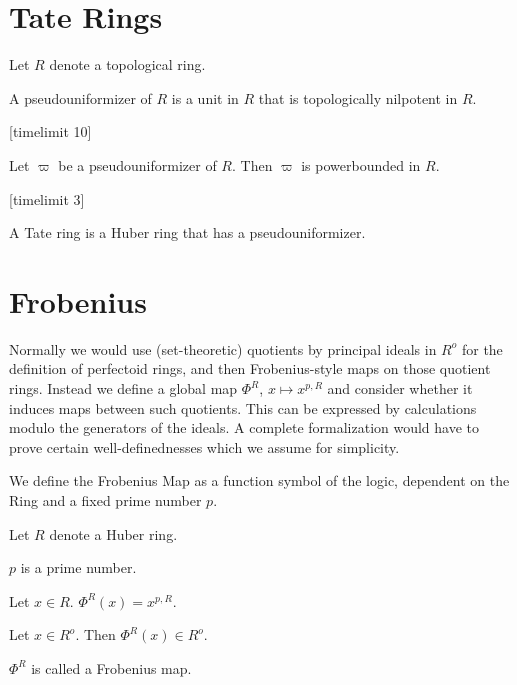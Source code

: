 \documentclass[english,11pt]{article}
\begin{document}
\section{Tate Rings}

\begin{forthel}

Let $R$ denote a topological ring.

\begin{definition}
A pseudouniformizer of $R$ is
a unit in $R$ that is topologically nilpotent in $R$.
\end{definition}


[timelimit 10]
\begin{lemma}
Let $\varpi$ be a pseudouniformizer of $R$.
Then $\varpi$ is powerbounded in $R$.
\end{lemma}
[timelimit 3]
\begin{definition}
A Tate ring is a Huber ring that has a pseudouniformizer.
\end{definition} 

\end{forthel} 
\section{Frobenius}
Normally we would use (set-theoretic) quotients by principal ideals in $R^o$
for the definition of perfectoid rings, and then Frobenius-style maps on
those quotient rings.
Instead we define a global map $\Phi^R$, $x \mapsto x^{p,R}$ and consider
whether it induces maps between such quotients. This
can be expressed by calculations modulo the generators of the ideals. 
A complete formalization would have to prove certain well-definednesses
which we assume for simplicity.

We define the Frobenius Map as a function symbol of the logic, dependent
on the Ring and a fixed prime number $p$.

\begin{forthel}
Let $R$ denote a Huber ring.

\begin{signature} $p$ is a prime number. 
\end{signature}

\begin{definition}
Let $x \in R$. $\Phi^{R} (x) = x^{p,R}$. 
\end{definition}

\begin{lemma}
Let $x \in R^o$. Then $\Phi^{R}(x) \in R^o$.
\end{lemma}

\end{forthel} $\Phi^{R}$ is called a Frobenius map. 
\end{document}
